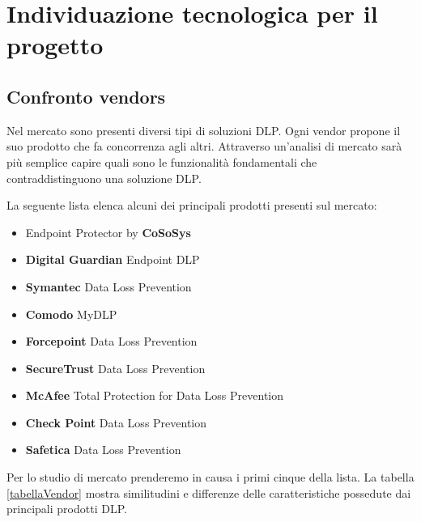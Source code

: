 \chapter{Individuazione tecnologica per il progetto}

\section{Confronto vendors}
Nel mercato sono presenti diversi tipi di soluzioni DLP. Ogni vendor propone il suo prodotto che fa 
concorrenza agli altri. Attraverso un'analisi di mercato sarà più semplice capire quali sono le funzionalità
fondamentali che contraddistinguono una soluzione DLP.

La seguente lista elenca alcuni dei principali prodotti presenti sul mercato:

\begin{itemize}
    \item Endpoint Protector by \textbf{CoSoSys}
    \item \textbf{Digital Guardian} Endpoint DLP
    \item \textbf{Symantec} Data Loss Prevention
    \item \textbf{Comodo} MyDLP
    \item \textbf{Forcepoint} Data Loss Prevention
    \item \textbf{SecureTrust} Data Loss Prevention
    \item \textbf{McAfee} Total Protection for Data Loss Prevention
    \item \textbf{Check Point} Data Loss Prevention
    \item \textbf{Safetica} Data Loss Prevention
  \end{itemize}

  Per lo studio di mercato prenderemo in causa i primi cinque della lista. 
  La tabella \ref{tabellaVendor} mostra similitudini e differenze delle caratteristiche possedute dai 
  principali prodotti DLP.

